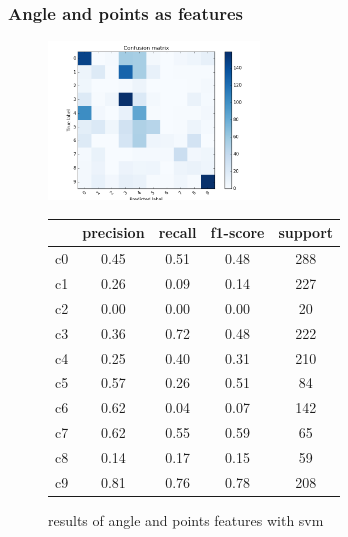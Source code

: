 \documentclass[10pt,twocolumn,letterpaper]{article}
\begin{document}
\subsubsection{Angle and points as features}
\begin{figure}[h]
	\centering
	\includegraphics[width=0.5\textwidth]{all_vs_all_headpose}\hspace{0.01\textwidth}
	\begin{tabular}{c||c|c|c|c}
	  & precision&recall&f1-score&support\\	\hline
	 c0&0.45&0.51&0.48&288\\
	 c1&0.26&0.09&0.14&227\\
	 c2&0.00&0.00&0.00&20\\
	 c3&0.36&0.72&0.48&222\\
	 c4&0.25&0.40&0.31&210\\
	 c5&0.57&0.26&0.51&84\\
	 c6&0.62&0.04&0.07&142\\
	 c7&0.62&0.55&0.59&65\\
	 c8&0.14&0.17&0.15&59\\
	 c9&0.81&0.76&0.78&208
	\end{tabular}
	\caption{results of angle and points features with svm}
	\label{headposeandpoints_feature}
	\end{figure}
\end{document}
